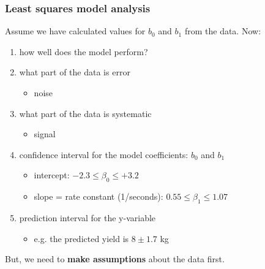 \begin{frame}\frametitle{Least squares model \textcolor{myOrange}{analysis}}

	Assume we have calculated values for $b_0$ and $b_1$ from the data. Now:
	\begin{enumerate}
		\item	how well does the model perform?
		\item	what part of the data is error
		\begin{itemize}
			\item	noise
		\end{itemize}
		\item	what part of the data is systematic
		\begin{itemize}
			\item	signal
		\end{itemize}
		\item	confidence interval for the model coefficients: $b_0$ and $b_1$
		\begin{itemize}
			\item	intercept: $-2.3 \leq \beta_0 \leq +3.2$
			\item	slope = rate constant (1/seconds): $0.55 \leq \beta_1 \leq 1.07$
		\end{itemize}
		\item	prediction interval for the y-variable
		\begin{itemize}
			\item	e.g. the predicted yield is $8 \pm 1.7$ kg
		\end{itemize}
	\end{enumerate}

	But, we need to \textbf{make assumptions} about the data first.
\end{frame}

